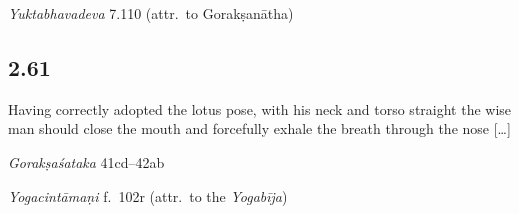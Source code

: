 \begin{ekdosis}
\begin{testimonia}[hp02_060]
\emph{Yuktabhavadeva} 7.110 (attr.~to Gorakṣanātha)

\begin{versinnote}
\end{versinnote}
\end{testimonia}


\subsection*{2.61}
\begin{translation}[hp02_061]
Having correctly adopted the lotus pose, with his neck and torso straight the wise man should close the mouth and forcefully exhale the breath through the nose [\ldots]
\end{translation}

\begin{sources}[hp02_061]
\emph{Gorakṣaśataka} 41cd–42ab

\begin{versinnote}
\end{versinnote}
\end{sources}

\begin{testimonia}[hp02_061]
\emph{Yogacintāmaṇi} f.~102r (attr.~to the \emph{Yogabīja})


\end{testimonia}
\end{ekdosis}
